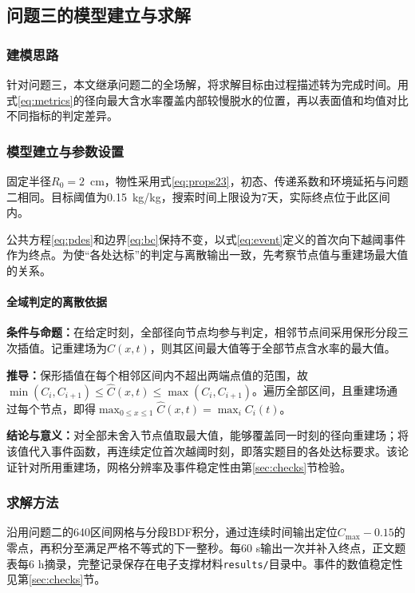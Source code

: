 \FloatBarrier
\subsection{问题三的模型建立与求解}\label{sec:q3}
\subsubsection{建模思路}
针对问题三，本文继承问题二的全场解，将求解目标由过程描述转为完成时间。用式\eqref{eq:metrics}的径向最大含水率覆盖内部较慢脱水的位置，再以表面值和均值对比不同指标的判定差异。

\subsubsection{模型建立与参数设置}
固定半径$R_0=2$~cm，物性采用式\eqref{eq:props23}，初态、传递系数和环境延拓与问题二相同。目标阈值为0.15~kg/kg，搜索时间上限设为7天，实际终点位于此区间内。

公共方程\eqref{eq:pdes}和边界\eqref{eq:bc}保持不变，以式\eqref{eq:event}定义的首次向下越阈事件作为终点。为使“各处达标”的判定与离散输出一致，先考察节点值与重建场最大值的关系。

\paragraph{全域判定的离散依据}
\textbf{条件与命题：}在给定时刻，全部径向节点均参与判定，相邻节点间采用保形分段三次插值。记重建场为$\widehat C(x,t)$，则其区间最大值等于全部节点含水率的最大值。

\textbf{推导：}保形插值在每个相邻区间内不超出两端点值的范围，故$\min(C_i,C_{i+1})\leq\widehat C(x,t)\leq\max(C_i,C_{i+1})$。遍历全部区间，且重建场通过每个节点，即得$\max_{0\leq x\leq1}\widehat C(x,t)=\max_i C_i(t)$。

\textbf{结论与意义：}对全部未舍入节点值取最大值，能够覆盖同一时刻的径向重建场；将该值代入事件函数，再连续定位首次越阈时刻，即落实题目的各处达标要求。该论证针对所用重建场，网格分辨率及事件稳定性由第\ref{sec:checks}节检验。

\subsubsection{求解方法}
沿用问题二的640区间网格与分段BDF积分，通过连续时间输出定位$C_{\max}-0.15$的零点，再积分至满足严格不等式的下一整秒。每60 s输出一次并补入终点，正文题表每6 h摘录，完整记录保存在电子支撑材料\texttt{results/}目录中。事件的数值稳定性见第\ref{sec:checks}节。

